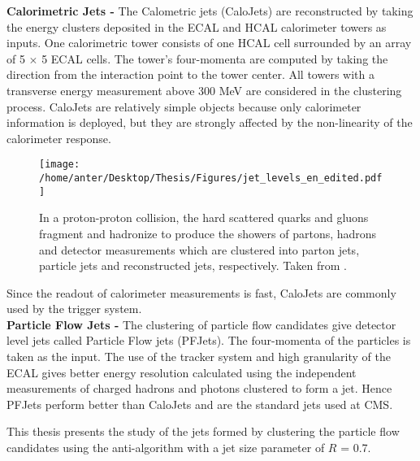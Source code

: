 {\bf Calorimetric Jets -} The Calometric jets (CaloJets) are reconstructed by taking the energy clusters deposited in the ECAL and HCAL calorimeter towers as inputs. One calorimetric tower consists of one HCAL cell surrounded by an array of 5 $\times$ 5 ECAL cells. The tower’s four-momenta are computed by taking the direction from the interaction point to the tower center. All towers with a transverse energy measurement above 300 MeV are considered in the clustering process. CaloJets are relatively simple objects because only calorimeter information is deployed, but they are strongly affected by the non-linearity of the calorimeter response. \begin{figure}[!h]
\begin{center}
\vspace*{3mm} 
\hspace*{-5mm}
\texttt{[image: /home/anter/Desktop/Thesis/Figures/jet\_levels\_en\_edited.pdf]}\\
\vspace*{4mm}
\caption[Formation of jets in a proton-proton collision at different levels.]{In a proton-proton collision, the hard scattered quarks and gluons fragment and hadronize to produce the showers of partons, hadrons and detector measurements which are clustered into parton jets, particle jets and reconstructed jets, respectively. Taken from \cite{Schorner-Sadenius:2015cga}.}
\label{fig:jets}
\end{center}
\end{figure} Since the readout of calorimeter measurements is fast, CaloJets are commonly used by the trigger system. \\ \newline
{\bf Particle Flow Jets -} The clustering of particle flow candidates give detector level jets called Particle Flow jets (PFJets). The four-momenta of the particles is taken as the input. The use of the tracker system and high granularity of the ECAL gives better energy resolution calculated using the independent measurements of charged hadrons and photons clustered to form a jet. Hence PFJets perform better than CaloJets and are the standard jets used at CMS.

This thesis presents the study of the jets formed by clustering the particle flow candidates using the anti-\kt algorithm with a jet size parameter of $R$ = 0.7. 

